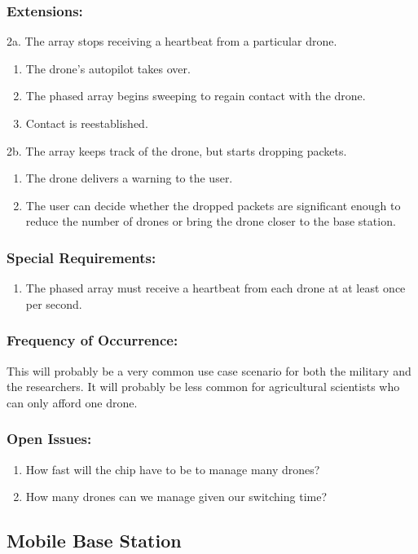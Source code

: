 \documentclass[ProductRequirements.tex]{subfiles}
\begin{document}
	\subsubsection*{Extensions:}
	2a. The array stops receiving a heartbeat from a particular drone.
	\begin{enumerate}
		\item The drone's autopilot takes over.
		\item The phased array begins sweeping to regain contact with the drone.
		\item Contact is reestablished.
	\end{enumerate}
	2b. The array keeps track of the drone, but starts dropping packets.
	\begin{enumerate}
		\item The drone delivers a warning to the user.
		\item The user can decide whether the dropped packets are significant enough to reduce the number of drones or bring the drone closer to the base station.
	\end{enumerate}
	\subsubsection*{Special Requirements:}
	\begin{enumerate}\itemsep1pt
		\item The phased array must receive a heartbeat from each drone at at least once per second.
	\end{enumerate}
	\subsubsection*{Frequency of Occurrence:}
	This will probably be a very common use case scenario for both the military and the researchers. It will probably be less common for agricultural scientists who can only afford one drone.
	\subsubsection*{Open Issues:}
	\begin{enumerate}
		\item How fast will the chip have to be to manage many drones?
		\item How many drones can we manage given our switching time?
	\end{enumerate}
	
	\subsection{Mobile Base Station}
\end{document}
